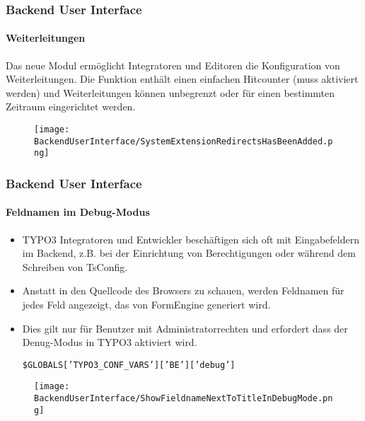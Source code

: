
\begin{frame}[fragile]
	\frametitle{Backend User Interface}
	\framesubtitle{Weiterleitungen}

	Das neue Modul ermöglicht Integratoren und Editoren die Konfiguration von Weiterleitungen.
	Die Funktion enthält einen einfachen Hitcounter (muss aktiviert werden) und
	Weiterleitungen können unbegrenzt oder für einen bestimmten Zeitraum eingerichtet werden.

	\begin{figure}
		\texttt{[image: BackendUserInterface/SystemExtensionRedirectsHasBeenAdded.png]}
	\end{figure}

\end{frame}


\begin{frame}[fragile]
	\frametitle{Backend User Interface}
	\framesubtitle{Feldnamen im Debug-Modus}

	\begin{itemize}

		\item TYPO3 Integratoren und Entwickler beschäftigen sich oft mit Eingabefeldern im Backend,
			z.B. bei der Einrichtung von Berechtigungen oder während dem Schreiben von TsConfig.

		\item Anstatt in den Quellcode des Browsers zu schauen, werden Feldnamen für jedes Feld angezeigt,
			das von FormEngine generiert wird.

		\item Dies gilt nur für Benutzer mit Administratorrechten und erfordert
			dass der Denug-Modus in TYPO3 aktiviert wird.

			\smaller
				\texttt{\$GLOBALS['TYPO3\_CONF\_VARS']['BE']['debug']}
			\normalsize

	\end{itemize}

	\begin{figure}
		\texttt{[image: BackendUserInterface/ShowFieldnameNextToTitleInDebugMode.png]}
	\end{figure}

\end{frame}

